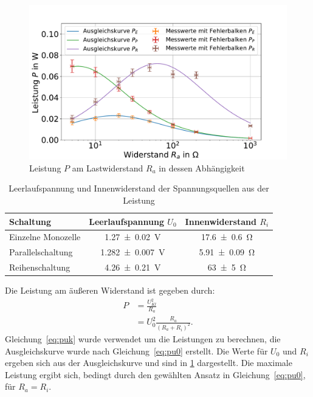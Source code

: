 
\begin{figure}
	\centering
	\includegraphics[width=0.9\linewidth]{"auswertung/Auswertung Innenwiderstand/Batterie Gesamt P"}
	\caption{Leistung $P$ am Lastwiderstand $R_a$ in dessen Abhängigkeit}
	\label{fig:batt-ges-p}
\end{figure}



\begin{table}
	\caption{Leerlaufspannung und Innenwiderstand der Spannungsquellen aus der Leistung}
	\centering
	\begin{tabular}{|l||c|c|}
		\hline 
		Schaltung & Leerlaufspannung $U_0$ & Innenwiderstand $R_i$ \\ 
		\hline \hline
		Einzelne Monozelle	& \SI{1.27+-0.02}{V}  & \SI{17.6+-0.6}{\ohm } \\ 
		\hline  
		Parallelschaltung	& \SI{1.282+-0.007}{V } &\SI{5.91+-0.09}{\ohm }  \\ 
		\hline   
		Reihenschaltung	& \SI{4.26+-0.21}{V } &\SI{63+-5}{\ohm }  \\ 
		\hline 
	\end{tabular} 
	
	\label{tab:batt-U-P}
	
\end{table}


Die Leistung am äußeren Widerstand ist gegeben durch: 
\begin{align}
 P &=\frac{U_{Kl}^2}{R_a} \label{eq:puk}\\
 &= U_0^2 \frac{R_a}{(R_a+R_i)^2} \label{eq:pu0}.
\end{align} 
Gleichung~\ref{eq:puk} wurde verwendet um die Leistungen zu berechnen, die Ausgleichskurve wurde nach Gleichung~\ref{eq:pu0} erstellt.
Die Werte für $U_0$ und $R_i$ ergeben sich aus der Ausgleichskurve und sind in \cref{tab:batt-U-P} dargestellt. Die maximale Leistung ergibt sich, bedingt durch den gewählten Ansatz in Gleichung~\ref{eq:pu0}, für $R_a=R_i$.\\







